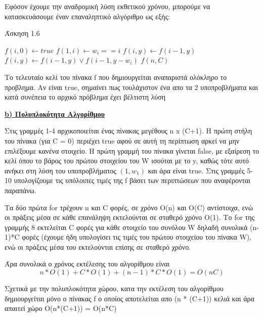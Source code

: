 \documentclass[12pt]{article}
\begin{document}
    Εφόσον έχουμε την αναδρομική λύση εκθετικού χρόνου, μπορούμε να κατασκευάσουμε έναν επαναληπτικό αλγόριθμο ως εξής:
    \begin{algorithm}[H]
        \caption{Άσκηση 1.6}
        \begin{algorithmic}[1]
             \State $f(i, 0) \gets true$ 
            \EndFor
             \State $f(1, i) \gets w_i == i$
            \EndFor
                    \State $f(i,y) \gets f(i-1, y)$
                \Else
                    \State $f(i,y) \gets f(i-1, y) \lor f(i-1, y-w_i) $
                \EndIf
                \EndFor
            \EndFor
            \Return $f(n,C)$
        \end{algorithmic}
    \end{algorithm}

    Το τελευταίο κελί του πίνακα f που δημιουργείται αναπαριστά ολόκληρο το προβλημα. Αν είναι true, σημαίνει πως τουλάχιστον ένα απο τα 2 υποπροβλήματα και κατά συνέπεια
    το αρχικό πρόβλημα έχει βέλτιστη λύση
    \begin{flushleft}\underline{\textbf{b) Πολυπλοκότητα Αλγορίθμου}}\end{flushleft}
    \vspace{5mm}

    Στις γραμμές 1-4 αρχικοποιείται ένας πίνακας μεγέθους n x (C+1). Η πρώτη στήλη του πίνακα (για C = 0) περιέχει true
    αφού σε αυτή τη περίπτωση αρκεί να μην επιλέξουμε κανένα στοιχείο. Η πρώτη γραμμή του πίνακα γίνεται false, με εξαίρεση το κελί όπου το βάρος του
    πρώτου στοιχείου του W ισούται με το y, καθώς τότε αυτό ανήκει στη λύση του υποπροβλήματος $(1, w_1)$ και άρα είναι true.
    Στις γραμμές 5-10 υπολογίζουμε τις υπόλοιπες τιμές της f βάσει των περιπτώσεων που αναφέρονται παραπάνω.

    Τα δύο πρώτα for τρέχουν n και C φορές, σε χρόνο Ο(n) και O(C) αντίστοιχα, ενώ οι πράξεις μέσα σε κάθε επανάληψη
    εκτελούνται σε σταθερό χρόνο Ο(1).  Το for της γραμμής 8 εκτελείται C φορές για κάθε στοιχείο του συνόλου W
    δηλαδή συνολικά (n-1)*C φορές (έχουμε ήδη υπολογίσει τις τιμές του πρώτου στοιχείου του πίνακα W), 
    ενώ οι πράξεις μέσα του εκτελούνται επίσης σε σταθερό χρόνο.

    Άρα συνολικά ο χρόνος εκτέλεσης του αλγορίθμου είναι \[n*O(1) + C*O(1) + (n-1)*C*O(1) = O(nC) \] 

    Σχετικά με την πολυπλοκότητα χώρου, κατα την εκτέλεση του αλγορίθμου δημιουργείται μόνο ο πίνακας f 
    ο οποίος αποτελείται απο (n * (C+1)) κελιά και άρα απαιτεί χώρο O(n*(C+1)) = O(n*C)
\end{document}
